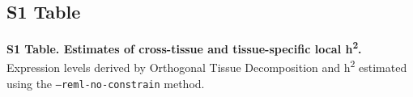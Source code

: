 \documentclass[10pt,letterpaper]{article}
\begin{document}
\subsection*{S1 Table}
{\bf S1 Table. Estimates of cross-tissue and tissue-specific local h\textsuperscript{2}.} Expression levels derived by Orthogonal Tissue Decomposition and h\textsuperscript{2} estimated using the \texttt{--reml-no-constrain} method.
\end{document}
